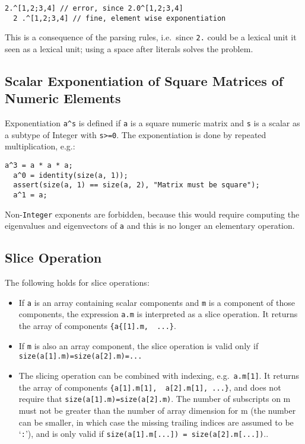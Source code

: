 \begin{example}
\begin{lstlisting}[language=modelica]
  2.^[1,2;3,4] // error, since 2.0^[1,2;3,4]
  2 .^[1,2;3,4] // fine, element wise exponentiation
\end{lstlisting}
This is a consequence of the parsing rules, i.e.\ since \lstinline!2.! could be a lexical unit it seen as a lexical unit; using a space after
literals solves the problem.
\end{example}

\subsection{Scalar Exponentiation of Square Matrices of Numeric Elements}

Exponentiation \lstinline!a^s! is defined if \lstinline!a! is a square numeric matrix and \lstinline!s!
is a scalar as a subtype of Integer with \lstinline!s>=0!. The
exponentiation is done by repeated multiplication, e.g.:
\begin{lstlisting}[language=modelica]
  a^3 = a * a * a;
  a^0 = identity(size(a, 1));
  assert(size(a, 1) == size(a, 2), "Matrix must be square");
  a^1 = a;
\end{lstlisting}

\begin{nonnormative}
Non-\lstinline!Integer! exponents are forbidden, because this would require
computing the eigenvalues and eigenvectors of \lstinline!a! and this is no
longer an elementary operation.
\end{nonnormative}

\subsection{Slice Operation}

The following holds for slice operations:
\begin{itemize}
\item
  If \lstinline!a! is an array containing scalar components and \lstinline!m! is a component of
  those components, the expression \lstinline!a.m! is interpreted as a slice operation. It returns the array of components \lstinline!{a{[1].m,  ...}!.
\item
  If \lstinline!m! is also an array component, the slice operation is valid only if \lstinline!size(a[1].m)=size(a[2].m)=...!
\item
  The slicing operation can be combined with indexing, e.g.\ \lstinline!a.m[1]!.
  It returns the array of components  \lstinline!{a[1].m[1],  a[2].m[1], ...}!, and does not require that
   \lstinline!size(a[1].m)=size(a[2].m)!. The number of subscripts on m must
  not be greater than the number of array dimension for m (the number
  can be smaller, in which case the missing trailing indices are assumed
  to be `\lstinline!:!'), and is only valid if \lstinline!size(a[1].m[...]) = size(a[2].m[...])!..
\end{itemize}

